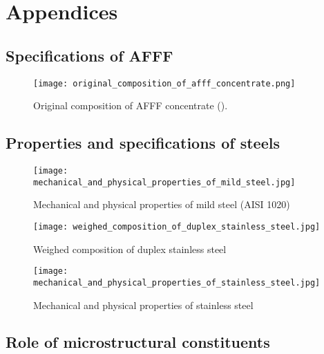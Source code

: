 
\chapter*{Appendices}

\section*{Specifications of AFFF}
\begin{figure}[H]
    \texttt{[image: original\_composition\_of\_afff\_concentrate.png]}
    \caption{Original composition of AFFF concentrate (\cite{hinnant2020characterizing}).}
    \label{appendix:specifications}
\end{figure}

\section*{Properties and specifications of steels}
\begin{figure}[H]
    \texttt{[image: mechanical\_and\_physical\_properties\_of\_mild\_steel.jpg]}
    \caption{Mechanical and physical properties of mild steel (AISI 1020) \cite{kabir2020critical}}
    \label{appendix:carbon_steel_properties}
\end{figure}

\begin{figure}[H]
    \texttt{[image: weighed\_composition\_of\_duplex\_stainless\_steel.jpg]}
    \caption{Weighed composition of duplex stainless steel \cite{sourmail2005stainless}}
    \label{appendix:duplex_stainless_steel_properties}
\end{figure}

\begin{figure}[H]
    \texttt{[image: mechanical\_and\_physical\_properties\_of\_stainless\_steel.jpg]}
    \caption{Mechanical and physical properties of stainless steel \cite{bhadeshia2017steels}}
    \label{appendix:stainless_steel_properties}
\end{figure}

\section*{Role of microstructural constituents}

